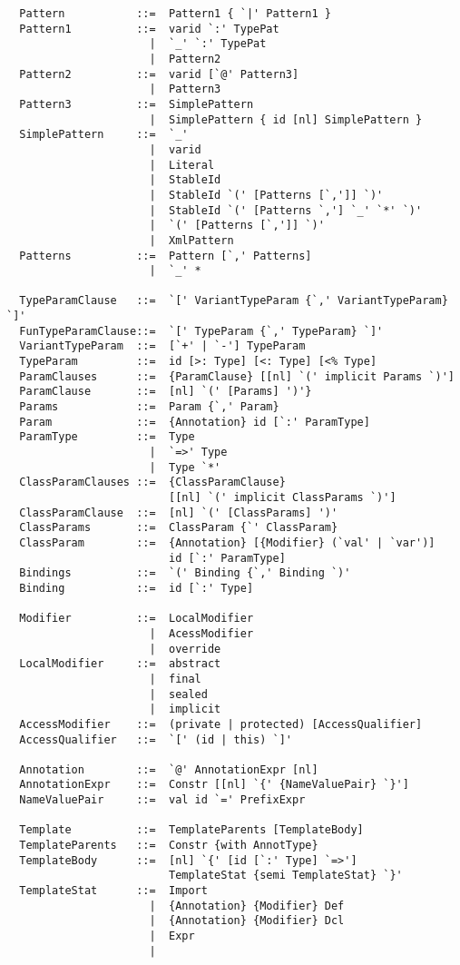 {\begin{lstlisting}
  Pattern           ::=  Pattern1 { `|' Pattern1 }
  Pattern1          ::=  varid `:' TypePat
                      |  `_' `:' TypePat
                      |  Pattern2
  Pattern2          ::=  varid [`@' Pattern3]
                      |  Pattern3
  Pattern3          ::=  SimplePattern
                      |  SimplePattern { id [nl] SimplePattern }
  SimplePattern     ::=  `_'
                      |  varid
                      |  Literal
                      |  StableId
                      |  StableId `(' [Patterns [`,']] `)'
                      |  StableId `(' [Patterns `,'] `_' `*' `)'
                      |  `(' [Patterns [`,']] `)'
                      |  XmlPattern
  Patterns          ::=  Pattern [`,' Patterns]
                      |  `_' *

  TypeParamClause   ::=  `[' VariantTypeParam {`,' VariantTypeParam} `]'
  FunTypeParamClause::=  `[' TypeParam {`,' TypeParam} `]'
  VariantTypeParam  ::=  [`+' | `-'] TypeParam
  TypeParam         ::=  id [>: Type] [<: Type] [<% Type]
  ParamClauses      ::=  {ParamClause} [[nl] `(' implicit Params `)']
  ParamClause       ::=  [nl] `(' [Params] ')'} 
  Params            ::=  Param {`,' Param}
  Param             ::=  {Annotation} id [`:' ParamType]
  ParamType         ::=  Type 
                      |  `=>' Type 
                      |  Type `*'
  ClassParamClauses ::=  {ClassParamClause} 
                         [[nl] `(' implicit ClassParams `)']
  ClassParamClause  ::=  [nl] `(' [ClassParams] ')'
  ClassParams       ::=  ClassParam {`' ClassParam}
  ClassParam        ::=  {Annotation} [{Modifier} (`val' | `var')] 
                         id [`:' ParamType]
  Bindings          ::=  `(' Binding {`,' Binding `)'
  Binding           ::=  id [`:' Type]

  Modifier          ::=  LocalModifier 
                      |  AcessModifier
                      |  override
  LocalModifier     ::=  abstract
                      |  final
                      |  sealed
                      |  implicit
  AccessModifier    ::=  (private | protected) [AccessQualifier]
  AccessQualifier   ::=  `[' (id | this) `]'

  Annotation        ::=  `@' AnnotationExpr [nl]
  AnnotationExpr    ::=  Constr [[nl] `{' {NameValuePair} `}']
  NameValuePair     ::=  val id `=' PrefixExpr

  Template          ::=  TemplateParents [TemplateBody]
  TemplateParents   ::=  Constr {with AnnotType}
  TemplateBody      ::=  [nl] `{' [id [`:' Type] `=>'] 
                         TemplateStat {semi TemplateStat} `}'
  TemplateStat      ::=  Import
                      |  {Annotation} {Modifier} Def
                      |  {Annotation} {Modifier} Dcl
                      |  Expr
                      |


\end{lstlisting}}
